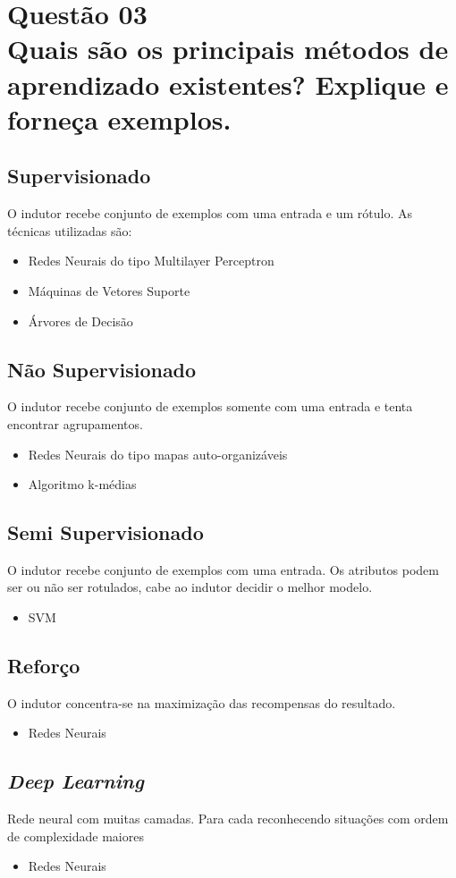 \documentclass[12pt]{article}
\begin{document}
\section{Questão 03\\
Quais são os principais métodos de aprendizado existentes? Explique e forneça
exemplos.
}
\subsection{Supervisionado}
O indutor recebe conjunto de exemplos com uma entrada e um rótulo.
As técnicas utilizadas são:
\begin{itemize}
    \item Redes Neurais do tipo Multilayer Perceptron
    \item Máquinas de Vetores Suporte
    \item Árvores de Decisão
\end{itemize}

\subsection{Não Supervisionado}
O indutor recebe conjunto de exemplos somente com uma entrada e tenta encontrar agrupamentos.
\begin{itemize}
    \item Redes Neurais do tipo mapas auto-organizáveis
    \item Algoritmo k-médias
\end{itemize}

\subsection{Semi Supervisionado}
O indutor recebe conjunto de exemplos com uma entrada.
Os atributos podem ser ou não ser rotulados, cabe ao indutor decidir o melhor modelo.
\begin{itemize}
    \item SVM
\end{itemize}


\subsection{Reforço}
O indutor concentra-se na maximização das recompensas do resultado.
\begin{itemize}
    \item Redes Neurais
\end{itemize}

\subsection{\textit{Deep Learning}}
Rede neural com muitas camadas. Para cada reconhecendo
situações com ordem de complexidade maiores
\begin{itemize}
    \item Redes Neurais
\end{itemize}
\end{document}
